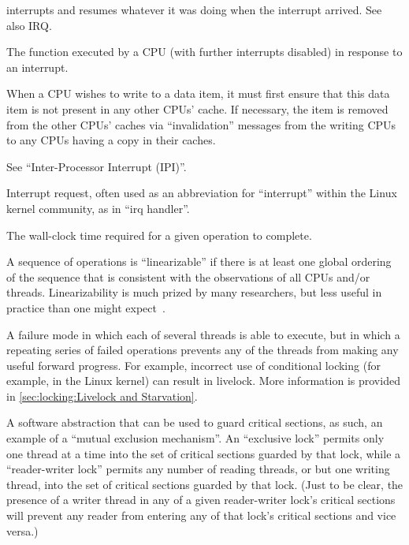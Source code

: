 \begin{description}
	interrupts and resumes whatever it was doing when the interrupt
	arrived.
	See also IRQ.
\item[\IXG{Interrupt Handler}:]
	The function executed by a CPU (with further interrupts disabled)
	in response to an interrupt.
\item[\IXG{Invalidation}:]
	When a CPU wishes to write to a data item, it must first ensure
	that this data item is not present in any other CPUs' cache.
	If necessary, the item is removed from the other CPUs' caches
	via ``invalidation'' messages from the writing CPUs to any
	CPUs having a copy in their caches.
\item[IPI:]
	See ``Inter-Processor Interrupt (IPI)''.
\item[IRQ:]
	Interrupt request, often used as an abbreviation for ``interrupt''
	within the Linux kernel community, as in ``irq handler''.
\item[\IXG{Latency}:]
	The wall-clock time required for a given operation to complete.
\item[\IXG{Linearizable}:]
	A sequence of operations is ``linearizable'' if there is at
	least one global ordering of the sequence that is consistent
	with the observations of all CPUs and/or threads.
	Linearizability is much prized by many researchers, but less
	useful in practice than one might
	expect~\cite{AndreasHaas2012FIFOisnt}.
\item[\IXG{Livelock}:]
	A failure mode in which each of several threads is able to
	execute, but in which a repeating series of failed operations
	prevents any of the threads from making any useful forward progress.
	For example, incorrect use of conditional locking
	(for example,  in the Linux kernel)
	can result in livelock.
	More information is provided in
	\cref{sec:locking:Livelock and Starvation}.
\item[\IXG{Lock}:]
	A software abstraction that can be used to guard critical sections,
	as such, an example of a ``mutual exclusion mechanism''.
	An ``exclusive lock'' permits only one thread at a time into the
	set of critical sections guarded by that lock, while a
	``reader-writer lock'' permits any number of reading
	threads, or but one writing thread, into the set of critical
	sections guarded by that lock.
	(Just to be clear, the presence	of a writer thread in any of
	a given reader-writer lock's critical sections will prevent
	any reader from entering any of that lock's critical sections
	and vice versa.)
\item[\IXG{Lock Contention}:]

\end{description}
